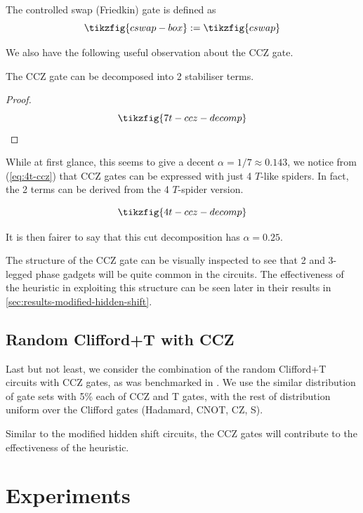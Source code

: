 \begin{definition}
    The controlled swap (Friedkin) gate is defined as
\begin{equation}
    \tikzfig{cswap-box} := \tikzfig{cswap}
\end{equation}
\end{definition}


We also have the following useful observation about the CCZ gate.

\begin{lemma}
    The CCZ gate can be decomposed into 2 stabiliser terms.
\end{lemma}
\begin{proof}
\begin{equation}
    \tikzfig{7t-ccz-decomp}
\end{equation}
\end{proof}

While at first glance, this seems to give a decent $\alpha = 1/7 \approx 0.143$,
we notice from (\ref{eq:4t-ccz}) that CCZ gates can be expressed with just 4 $T$-like spiders.
In fact, the 2 terms can be derived from the 4 $T$-spider version.

\begin{equation}
    \tikzfig{4t-ccz-decomp}
\end{equation}

It is then fairer to say that this cut decomposition has $\alpha = 0.25$.

The structure of the CCZ gate can be visually inspected to see that 2 and 3-legged phase gadgets will be
quite common in the circuits.
The effectiveness of the heuristic in exploiting this structure can be seen later
in their results in \autoref{sec:results-modified-hidden-shift}.

\clearpage
\subsection{Random Clifford+T with CCZ}
Last but not least, we consider the combination of the random Clifford+T circuits with CCZ gates,
as was benchmarked in \cite{koch2023}.
We use the similar distribution of gate sets with 5\% each of CCZ and T gates,
with the rest of distribution uniform over the Clifford gates (Hadamard, CNOT, CZ, S).

Similar to the modified hidden shift circuits, the CCZ gates will contribute to the effectiveness
of the heuristic.

\clearpage
\section{Experiments}
\label{sec:experiments}

